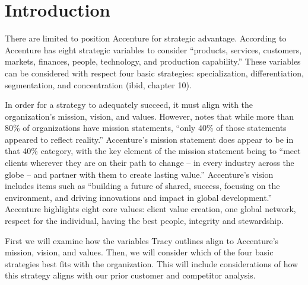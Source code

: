 \section{Introduction}

There are limited to position Accenture for strategic advantage.
According to \textcite[][chapter 8]{Tracy2015} Accenture has eight strategic
variables to consider ``products, services, customers, markets, finances,
people, technology, and production capability.'' These variables can be
considered with respect four basic strategies: specialization, differentiation,
segmentation, and concentration (ibid, chapter 10).

In order for a strategy to adequately succeed, it must align with the
organization's mission, vision, and values. However, \textcite{cadyMissionVisionValues2011} notes that while more than 80\% of
organizations have mission statements, ``only 40\% of those statements appeared
to reflect reality.'' Accenture's mission statement does appear to be in that
40\% category, with the key element of the mission statement being to ``meet
clients wherever they are on their path to change -- in every industry across
the globe -- and partner with them to create lasting value.'' Accenture's vision
includes items such as ``building a future of shared, success, focusing on the
environment, and driving innovations and impact in global development.''
Accenture highlights eight core values: client value creation, one global
network, respect for the individual, having the best people, integrity and
stewardship.

First we will examine how the variables Tracy outlines align to Accenture's
mission, vision, and values. Then, we will consider which of the four basic
strategies best fits with the organization. This will include considerations of
how this strategy aligns with our prior customer and competitor analysis.
